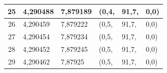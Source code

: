 \begin{table}[!htb]
\begin{tabular}{|c|l|l|l|l|l|}
25                             & {\color[HTML]{000000} 4,290488}                                                                             & {\color[HTML]{000000} 7,879189}                                                                              & {\color[HTML]{000000} (0,4,}    & {\color[HTML]{000000} 91,7,}    & {\color[HTML]{000000} 0,0)}     \\ \hline
26                             & {\color[HTML]{000000} 4,290459}                                                                             & {\color[HTML]{000000} 7,879222}                                                                              & {\color[HTML]{000000} (0,5,}    & {\color[HTML]{000000} 91,7,}    & {\color[HTML]{000000} 0,0)}     \\ \hline
27                             & {\color[HTML]{000000} 4,290454}                                                                             & {\color[HTML]{000000} 7,879234}                                                                              & {\color[HTML]{000000} (0,5,}    & {\color[HTML]{000000} 91,7,}    & {\color[HTML]{000000} 0,0)}     \\ \hline
28                             & {\color[HTML]{000000} 4,290452}                                                                             & {\color[HTML]{000000} 7,879245}                                                                              & {\color[HTML]{000000} (0,5,}    & {\color[HTML]{000000} 91,7,}    & {\color[HTML]{000000} 0,0)}     \\ \hline
29                             & {\color[HTML]{000000} 4,290462}                                                                             & {\color[HTML]{000000} 7,87925}                                                                               & {\color[HTML]{000000} (0,5,}    & {\color[HTML]{000000} 91,7,}    & {\color[HTML]{000000} 0,0)}     \\ \hline
\end{tabular}
\end{table}
\vspace{1ex}

